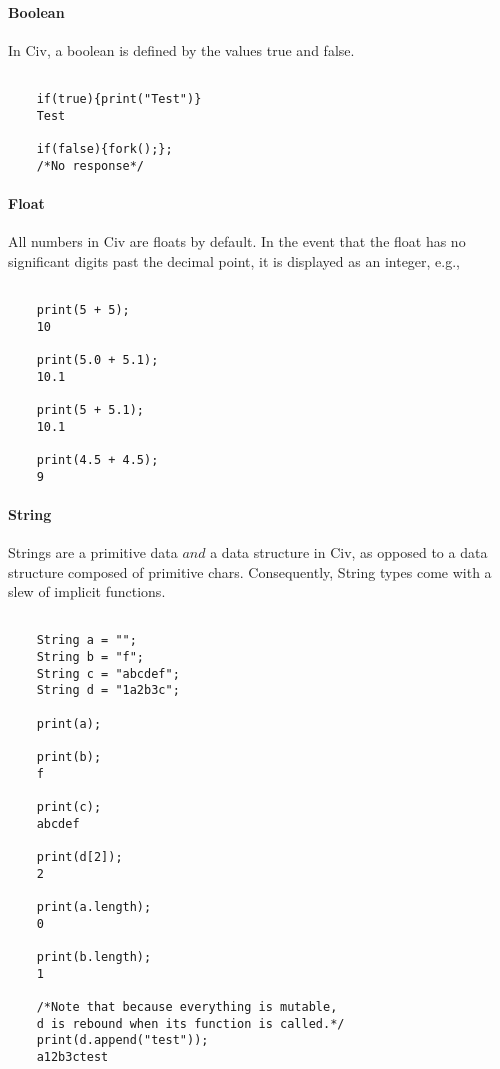 \documentclass[a4paper]{article}
\begin{document}
\paragraph{Boolean}
In Civ, a boolean is defined by the values {\selectfont true} and {\selectfont false}. 

{\selectfont
\begin{lstlisting} 
    
    if(true){print("Test")}
    Test
        
    if(false){fork();};
    /*No response*/

\end{lstlisting}
}

\paragraph{Float}
All numbers in Civ are floats by default. In the event that the float has no significant digits past the decimal point, it is displayed as an integer, e.g.,

{\selectfont
\begin{lstlisting} 

    print(5 + 5);
    10
    
    print(5.0 + 5.1);
    10.1
    
    print(5 + 5.1);
    10.1
    
    print(4.5 + 4.5);
    9

\end{lstlisting}
}

\paragraph{String}
Strings are a primitive data $and$ a data structure in Civ, as opposed to a data structure composed of primitive chars. Consequently, String types come with a slew of implicit functions.

{\selectfont
\begin{lstlisting}

    String a = "";
    String b = "f";
    String c = "abcdef";
    String d = "1a2b3c";
    
    print(a);
    
    print(b);
    f
    
    print(c);
    abcdef
    
    print(d[2]);
    2
    
    print(a.length);
    0
    
    print(b.length);
    1
    
    /*Note that because everything is mutable,
    d is rebound when its function is called.*/
    print(d.append("test"));
    a12b3ctest
	
\end{lstlisting}
}
\end{document}
